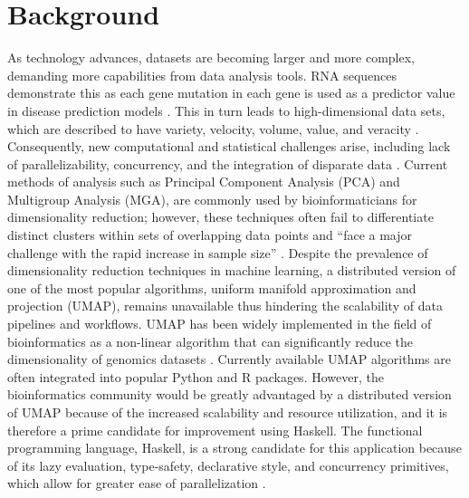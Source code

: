 \documentclass[11pt,letterpaper]{article}
\begin{document}

\section{Background}

As technology advances, datasets are becoming larger and more complex, demanding more capabilities from data analysis tools. RNA sequences demonstrate this as each gene mutation in each gene is used as a predictor value in disease prediction models \cite{huang2018high}. This in turn leads to high-dimensional data sets, which are described to have variety, velocity, volume, value, and veracity \cite{anuradha2015brief}. Consequently, new computational and statistical challenges arise, including lack of parallelizability, concurrency, and the integration of disparate data \cite{Schadt_2010}. Current methods of analysis such as Principal Component Analysis (PCA) and Multigroup Analysis (MGA), are commonly used by bioinformaticians for dimensionality reduction; however, these techniques often fail to differentiate distinct clusters within sets of overlapping data points and ``face a major challenge with the rapid increase in sample size'' \cite{yang2021dimensionality}. Despite the prevalence of dimensionality reduction techniques in machine learning, a distributed version of one of the most popular algorithms, uniform manifold approximation and projection (UMAP), remains unavailable thus hindering the scalability of data pipelines and workflows. UMAP has been widely implemented in the field of bioinformatics as a non-linear algorithm that can significantly reduce the dimensionality of genomics datasets \cite{bollon2022investigating}. Currently available UMAP algorithms are often integrated into popular Python and R packages. However, the bioinformatics community would be greatly advantaged by a distributed version of UMAP because of the increased scalability and resource utilization, and it is therefore a prime candidate for improvement using Haskell. The functional programming language, Haskell, is a strong candidate for this application because of its lazy evaluation, type-safety, declarative style, and concurrency primitives, which allow for greater ease of parallelization \cite{arvidsson2014actors}.
\end{document}
